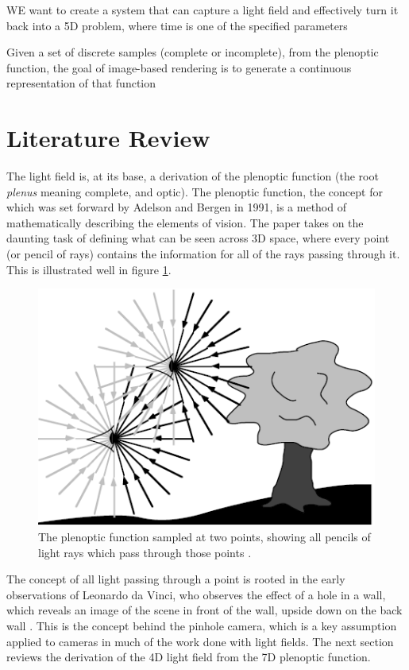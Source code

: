 \documentclass[12pt]{report}
\begin{document}
WE want to create a system that can capture a light field and effectively turn it back into a 5D problem, where time is one of the specified parameters

Given a set of discrete samples (complete or incomplete), from the plenoptic function, the goal of image-based rendering is to generate a continuous representation of that function\cite{McMillan95}

\chapter*{Literature Review}
The light field is, at its base, a derivation of the plenoptic function (the root \emph{plenus} meaning complete, and optic). The plenoptic function, the concept for which was set forward by Adelson and Bergen in 1991, is a method of mathematically describing the elements of vision. The paper takes on the daunting task of defining what can be seen across 3D space, where every point (or pencil of rays) contains the information for all of the rays passing through it.  This is illustrated well in figure  \ref{fig:plenoptic_visual}. 
\begin{figure}[!ht]
	\centering
	\includegraphics[scale=0.75]{plenoptic_image.png}
	\caption{The plenoptic function sampled at two points, showing all pencils of light rays which pass through those points \cite{Adelson91}.}
	\label{fig:plenoptic_visual}
\end{figure}
The concept of all light passing through a point is rooted in the early observations of Leonardo da Vinci, who observes the effect of a hole in a wall, which reveals an image of the scene in front of the wall, upside down on the back wall \cite{Adelson91}. This is the concept behind the pinhole camera, which is a key assumption applied to cameras in much of the work done with light fields. The next section reviews the derivation of the 4D light field from the 7D plenoptic function.  
\end{document}
